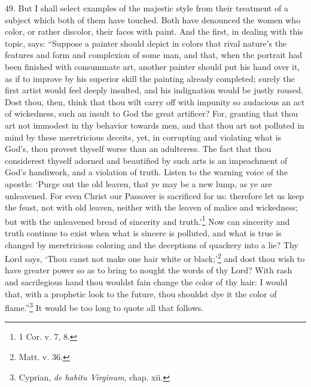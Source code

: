 49. But I shall select examples of the majestic style from their treatment of a subject which both of them have touched. Both have denounced the women who color, or rather discolor, their faces with paint. And the first, in dealing with this topic, says: “Suppose a painter should depict in colors that rival nature’s the features and form and complexion of some man, and that, when the portrait had been finished with consummate art, another painter should put his hand over it, as if to improve by his superior skill the painting already completed; surely the first artist would feel deeply insulted, and his indignation would be justly roused. Dost thou, then, think that thou wilt carry off with impunity so audacious an act of wickedness, such an insult to God the great artificer? For, granting that thou art not immodest in thy behavior towards men, and that thou art not polluted in mind by these meretricious deceits, yet, in corrupting and violating what is God’s, thou provest thyself worse than an adulteress. The fact that thou considerest thyself adorned and beautified by such arts is an impeachment of God’s handiwork, and a violation of truth. Listen to the warning voice of the apostle: ‘Purge out the old leaven, that ye may be a new lump, as ye are unleavened. For even Christ our Passover is sacrificed for us: therefore let us keep the feast, not with old leaven, neither with the leaven of malice and wickedness; but with the unleavened bread of sincerity and truth.’\footnote{1 Cor. v. 7, 8.} Now can sincerity and truth continue to exist when what is sincere is polluted, and what is true is changed by meretricious coloring and the deceptions of quackery into a lie? Thy Lord says, ‘Thou canst not make one hair white or black;’\footnote{Matt. v. 36.} and dost thou wish to have greater power so as to bring to nought the words of thy Lord? With rash and sacrilegious hand thou wouldst fain change the color of thy hair: I would that, with a prophetic look to the future, thou shouldst dye it the color of flame.”\footnote{Cyprian, \emph{de habitu Virginum}, chap. xii.} It would be too long to quote all that follows.

